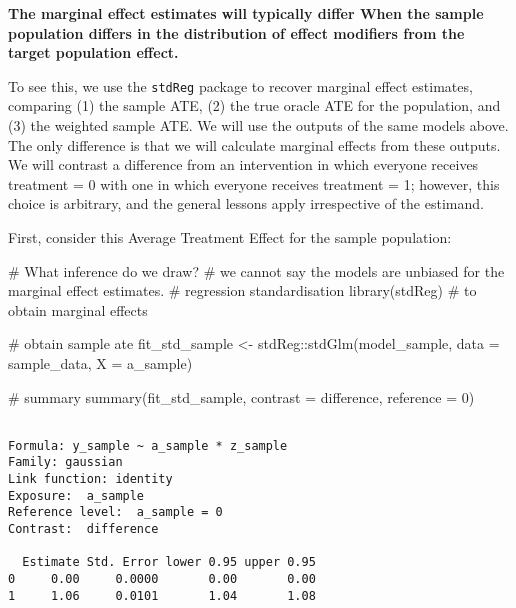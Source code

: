 \documentclass[
  single column]{article}
\newenvironment{Shaded}{\begin{snugshade}}{\end{snugshade}}
\newcommand{\AttributeTok}[1]{\textcolor[rgb]{0.40,0.45,0.13}{#1}}
\newcommand{\CommentTok}[1]{\textcolor[rgb]{0.37,0.37,0.37}{#1}}
\newcommand{\DecValTok}[1]{\textcolor[rgb]{0.68,0.00,0.00}{#1}}
\newcommand{\FunctionTok}[1]{\textcolor[rgb]{0.28,0.35,0.67}{#1}}
\newcommand{\NormalTok}[1]{\textcolor[rgb]{0.00,0.23,0.31}{#1}}
\newcommand{\OtherTok}[1]{\textcolor[rgb]{0.00,0.23,0.31}{#1}}
\newcommand{\SpecialCharTok}[1]{\textcolor[rgb]{0.37,0.37,0.37}{#1}}
\newcommand{\StringTok}[1]{\textcolor[rgb]{0.13,0.47,0.30}{#1}}
\begin{document}
\textbf{The marginal effect estimates will typically differ When the
sample population differs in the distribution of effect modifiers from
the target population effect.}

To see this, we use the \texttt{stdReg} package to recover marginal
effect estimates, comparing (1) the sample ATE, (2) the true oracle ATE
for the population, and (3) the weighted sample ATE. We will use the
outputs of the same models above. The only difference is that we will
calculate marginal effects from these outputs. We will contrast a
difference from an intervention in which everyone receives treatment = 0
with one in which everyone receives treatment = 1; however, this choice
is arbitrary, and the general lessons apply irrespective of the
estimand.

First, consider this Average Treatment Effect for the sample population:

\begin{Shaded}
\begin{Highlighting}[]
\CommentTok{\# What inference do we draw?  }
\CommentTok{\# we cannot say the models are unbiased for the marginal effect estimates. }
\CommentTok{\# regression standardisation }
\FunctionTok{library}\NormalTok{(stdReg) }\CommentTok{\# to obtain marginal effects }

\CommentTok{\# obtain sample ate}
\NormalTok{fit\_std\_sample }\OtherTok{\textless{}{-}}\NormalTok{ stdReg}\SpecialCharTok{::}\FunctionTok{stdGlm}\NormalTok{(model\_sample, }
  \AttributeTok{data =}\NormalTok{ sample\_data, }\AttributeTok{X =} \StringTok{\textquotesingle{}a\_sample\textquotesingle{}}\NormalTok{)}

\CommentTok{\# summary}
\FunctionTok{summary}\NormalTok{(fit\_std\_sample, }\AttributeTok{contrast =} \StringTok{\textquotesingle{}difference\textquotesingle{}}\NormalTok{, }\AttributeTok{reference =} \DecValTok{0}\NormalTok{)}
\end{Highlighting}
\end{Shaded}

\begin{verbatim}

Formula: y_sample ~ a_sample * z_sample
Family: gaussian 
Link function: identity 
Exposure:  a_sample 
Reference level:  a_sample = 0 
Contrast:  difference 

  Estimate Std. Error lower 0.95 upper 0.95
0     0.00     0.0000       0.00       0.00
1     1.06     0.0101       1.04       1.08
\end{verbatim}
\end{document}
